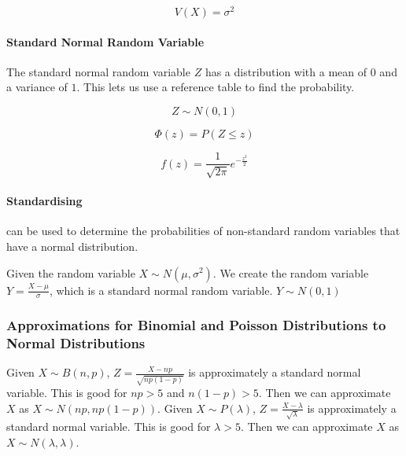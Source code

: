 \documentclass[a4paper, 10pt]{article}
\begin{document}
	\begin{equation*}
		V(X)=\sigma ^2
	\end{equation*}

	\paragraph{Standard Normal Random Variable}

	\noindent The standard normal random variable \(Z\) has a distribution with a mean of \(0\) and a variance of \(1\). This lets us use a reference table to find the probability.

	\begin{equation*}
		Z\sim N(0,1)
	\end{equation*}

	\begin{equation*}
		\Phi (z) = P(Z\leq z)
	\end{equation*}

	\begin{equation*}
		f(z)=\frac{1}{\sqrt{2\pi}}e^{-\frac{z^2}{2}}
	\end{equation*}

	\paragraph{Standardising}

	can be used to determine the probabilities of non-standard random variables that have a normal distribution.

	\noindent Given the random variable \(X\sim N(\mu , \sigma ^2)\). We create the random variable \(Y=\frac{X-\mu}{\sigma}\), which is a standard normal random variable. \(Y\sim N(0,1)\)

	\subsubsection{Approximations for Binomial and Poisson Distributions to Normal Distributions}

	Given \(X\sim B(n,p)\), \(Z=\frac{X-np}{\sqrt{np(1-p)}}\) is approximately a standard normal variable. This is good for \(np>5\) and \(n(1-p)>5\). Then we can approximate \(X\) as \(X\sim N(np, np(1-p))\).
	\newline
	\noindent Given \(X\sim P(\lambda)\), \(Z=\frac{X-\lambda}{\sqrt{\lambda}}\) is approximately a standard normal variable. This is good for \(\lambda>5\). Then we can approximate \(X\) as \(X\sim N(\lambda, \lambda)\).
\end{document}

